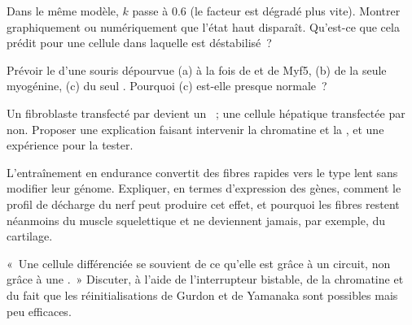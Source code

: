 \begin{exercise}[$\star\star$]\label{exo:b2:cell-differentiation:8}
Dans le même modèle, $k$ passe à $0.6$ (le facteur est dégradé plus
vite). Montrer graphiquement ou numériquement que l'état haut disparaît.
Qu'est-ce que cela prédit pour une cellule dans laquelle  est
déstabilisé~?
\end{exercise}

\begin{exercise}[$\star\star$]\label{exo:b2:cell-differentiation:9}
Prévoir le  d'une souris dépourvue (a) à la fois de  et de
Myf5, (b) de la seule myogénine, (c) du seul . Pourquoi (c) est-elle
presque normale~?
\end{exercise}

\begin{exercise}[$\star\star\star$]\label{exo:b2:cell-differentiation:10}
Un fibroblaste transfecté par  devient un ~; une cellule
hépatique transfectée par  non. Proposer une explication faisant
intervenir la chromatine et la , et une expérience pour la
tester.
\end{exercise}

\begin{exercise}[$\star\star\star$]\label{exo:b2:cell-differentiation:11}
L'entraînement en endurance convertit des fibres rapides vers le type
lent sans modifier leur génome. Expliquer, en termes d'expression des
gènes, comment le profil de décharge du nerf peut produire cet effet, et
pourquoi les fibres restent néanmoins du muscle squelettique et ne
deviennent jamais, par exemple, du cartilage.
\end{exercise}

\begin{exercise}[$\star\star\star$]\label{exo:b2:cell-differentiation:12}
«~Une cellule différenciée se souvient de ce qu'elle est grâce à un
circuit, non grâce à une .~» Discuter, à l'aide de
l'interrupteur bistable, de la chromatine et du fait que les
réinitialisations de Gurdon et de Yamanaka sont possibles mais peu
efficaces.
\end{exercise}

